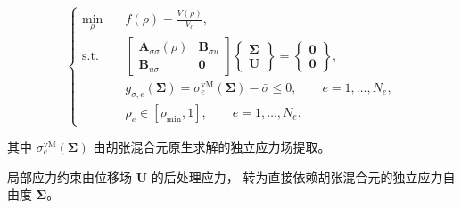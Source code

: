 \documentclass[notheorems]{beamer}
\begin{document}
\begin{frame}
{\begin{tcolorbox}
{					\begingroup
					\setlength{\jot}{2pt}
					\[
					\left\{
					\begin{aligned}
						\min_{\rho}\quad
						&
						f(\rho)
						=
						\frac{V(\rho)}{V_0},
						\\[2pt]
						\mathrm{s.t.}\quad
						&
						\begin{bmatrix}
							\boldsymbol{A}_{\sigma\sigma}(\rho)
							&
							\boldsymbol{B}_{\sigma u}
							\\
							\boldsymbol{B}_{u\sigma}
							&
							\boldsymbol{0}
						\end{bmatrix}
						\begin{Bmatrix}
							\boldsymbol{\Sigma}\\
							\boldsymbol{U}
						\end{Bmatrix}
						=
						\begin{Bmatrix}
							\boldsymbol{0}\\
							\boldsymbol{0}
						\end{Bmatrix},
						\\[3pt]
						&
						g_{\sigma,e}(\boldsymbol{\Sigma})
						=
						\sigma^{\mathrm{vM}}_{e}(\boldsymbol{\Sigma})
						-
						\bar{\sigma}
						\le 0,
						\qquad
						e=1,\ldots,N_e,
						\\[2pt]
						&
						\rho_e\in[\rho_{\min},1],
						\qquad
						e=1,\ldots,N_e .
					\end{aligned}
					\right.
					\]
					\endgroup
					
					{\fontsize{7.15}{9.5}\selectfont
						其中 \(\sigma^{\mathrm{vM}}_e(\boldsymbol{\Sigma})\)
						由胡张混合元原生求解的独立应力场提取。}
				}
			\end{tcolorbox}
			
			\begin{tcolorbox}[
				colback=structure.fg,
				colframe=structure.fg,
				coltext=white,
				boxrule=0pt,
				arc=3pt,
				top=3pt, bottom=3pt, left=8pt, right=8pt]
				\centering
				{\fontsize{7.55}{10.1}\selectfont\sffamily
					局部应力约束由位移场
					\(\boldsymbol{U}\) 的后处理应力，
					转为直接依赖胡张混合元的独立应力自由度
					\(\boldsymbol{\Sigma}\)。}
			\end{tcolorbox}
		}
		
\end{frame}
\end{document}

